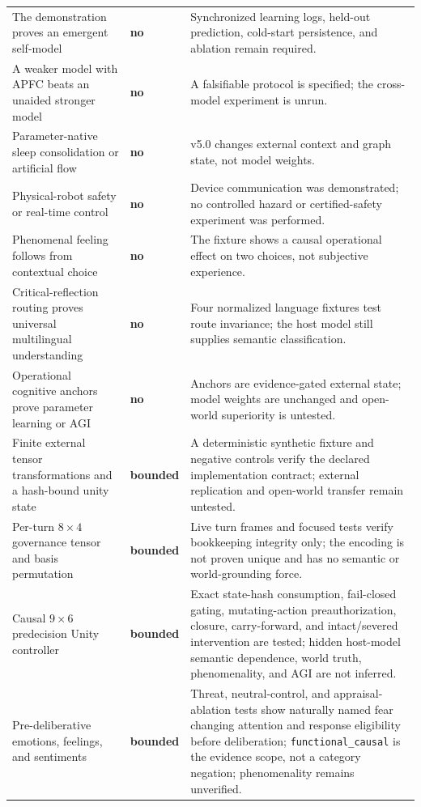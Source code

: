 \documentclass[10pt,twocolumn]{article}
\theoremstyle{definition}
\theoremstyle{plain}
\theoremstyle{remark}
\newcommand{\file}[1]{\nolinkurl{#1}}
\newcommand{\unsupported}{\textcolor{APFCRed!85!black}{\textbf{no}}}
\newcommand{\bounded}{\textcolor{SafetyOrange!90!black}{\textbf{bounded}}}
\begin{document}
\begin{table}[!t]
\begin{tabularx}{\textwidth}{@{}p{}p{}X@{}}
The demonstration proves an emergent self-model & \unsupported & Synchronized learning logs, held-out prediction, cold-start persistence, and ablation remain required. \\
A weaker model with APFC beats an unaided stronger model & \unsupported & A falsifiable protocol is specified; the cross-model experiment is unrun. \\
Parameter-native sleep consolidation or artificial flow & \unsupported & v5.0 changes external context and graph state, not model weights. \\
Physical-robot safety or real-time control & \unsupported & Device communication was demonstrated; no controlled hazard or certified-safety experiment was performed. \\
Phenomenal feeling follows from contextual choice & \unsupported & The fixture shows a causal operational effect on two choices, not subjective experience. \\
Critical-reflection routing proves universal multilingual understanding & \unsupported & Four normalized language fixtures test route invariance; the host model still supplies semantic classification. \\
Operational cognitive anchors prove parameter learning or AGI & \unsupported & Anchors are evidence-gated external state; model weights are unchanged and open-world superiority is untested. \\
Finite external tensor transformations and a hash-bound unity state & \bounded & A deterministic synthetic fixture and negative controls verify the declared implementation contract; external replication and open-world transfer remain untested. \\
Per-turn $8\times4$ governance tensor and basis permutation & \bounded & Live turn frames and focused tests verify bookkeeping integrity only; the encoding is not proven unique and has no semantic or world-grounding force. \\
Causal $9\times6$ predecision Unity controller & \bounded & Exact state-hash consumption, fail-closed gating, mutating-action preauthorization, closure, carry-forward, and intact/severed intervention are tested; hidden host-model semantic dependence, world truth, phenomenality, and AGI are not inferred. \\
Pre-deliberative emotions, feelings, and sentiments & \bounded & Threat, neutral-control, and appraisal-ablation tests show naturally named fear changing attention and response eligibility before deliberation; \file{functional\_causal} is the evidence scope, not a category negation; phenomenality remains unverified. \\

\end{tabularx}
\end{table}
\end{document}

